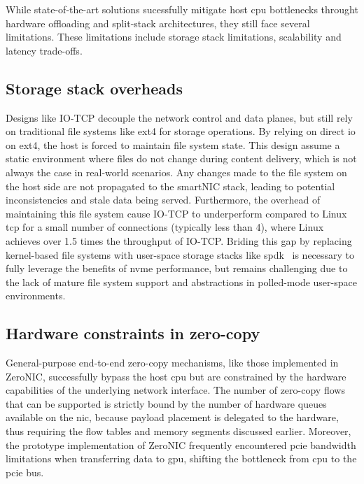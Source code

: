 While state-of-the-art solutions sucessfully mitigate host \acrshort{cpu} bottlenecks throught hardware offloading and split-stack architectures, they still face several limitations. These limitations include storage stack limitations, scalability and latency trade-offs.

\subsection{Storage stack overheads}

Designs like IO-TCP decouple the network control and data planes, but still rely on traditional file systems like ext4 for storage operations. By relying on direct \acrshort{io} on ext4, the host is forced to maintain file system state. This design assume a static environment where files do not change during content delivery, which is not always the case in real-world scenarios. Any changes made to the file system on the host side are not propagated to the smartNIC stack, leading to potential inconsistencies and stale data being served. Furthermore, the overhead of maintaining this file system cause IO-TCP to underperform compared to Linux \acrshort{tcp} for a small number of connections (typically less than 4), where Linux achieves over 1.5 times the throughput of IO-TCP.
Briding this gap by replacing kernel-based file systems with user-space storage stacks like \acrshort{spdk}~ is necessary to fully leverage the benefits of \acrshort{nvme} performance, but remains challenging due to the lack of mature file system support and abstractions in polled-mode user-space environments.

\subsection{Hardware constraints in zero-copy}


General-purpose end-to-end zero-copy mechanisms, like those implemented in ZeroNIC, successfully bypass the host \acrshort{cpu} but are constrained by the hardware capabilities of the underlying network interface. The number of zero-copy flows that can be supported is strictly bound by the number of hardware queues available on the \acrshort{nic}, because payload placement is delegated to the hardware, thus requiring the flow tables and memory segments discussed earlier. Moreover, the prototype implementation of ZeroNIC frequently encountered \acrshort{pcie} bandwidth limitations when transferring data to \acrshort{gpu}, shifting the bottleneck from \acrshort{cpu}
to the \acrshort{pcie} bus.


